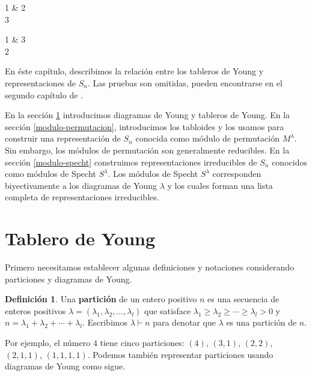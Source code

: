 \documentclass[12pt]{book}
\theoremstyle{definition}
\newtheorem{definition}[theorem]{Definición}
\newcounter{in}
\newcounter{ini}
\begin{document}
\begin{center}
  \begin{ytableau}
    1 & 2\\
    3
  \end{ytableau} \qquad
  \begin{ytableau}
    1 & 3\\
    2
  \end{ytableau}
\end{center}

En éste capítulo, describimos la relación entre los tableros de Young
y representaciones de $S_{n}$. Las pruebas son omitidas, pueden
encontrarse en el segundo capítulo de \cite{sagan2001symmetric}.

En la sección \ref{tablero} introducimos diagramas de Young y tableros
de Young. En la sección \ref{modulo-permutacion}, introducimos los
tabloides y los usamos para construir una representación de $S_{n}$
conocida como módulo de permutación $M^{\lambda}$. Sin embargo, los
módulos de permutación son generalmente reducibles. En la sección
\ref{modulo-specht} construimos representaciones irreducibles de
$S_{n}$ conocidos como módulos de Specht $S^{\lambda}$. Los módulos de
Specht $S^{\lambda}$ corresponden biyectivamente a los diagramas de
Young $\lambda$ y los cuales forman una lista completa de
representaciones irreducibles. 

\section{Tablero de Young}
\label{tablero}

Primero necesitamos establecer algunas definiciones y notaciones
considerando particiones y diagramas de Young.

\begin{definition}
  Una \textbf{partición} de un entero positivo $n$ es una secuencia de
  enteros positivos
  $\lambda=(\lambda_{1},\lambda_{2},\ldots,\lambda_{l})$ que satisface
  $\lambda_{1}\geq\lambda_{2}\geq\cdots\geq\lambda_{l}>0$ y
  $n=\lambda_{1}+\lambda_{2}+\cdots+\lambda_{l}$. Escribimos
  $\lambda\vdash n$ para denotar que $\lambda$ es una partición de $n$.
\end{definition}

Por ejemplo, el número $4$ tiene cinco particiones: $(4)$, $(3,1)$,
$(2,2)$, $(2,1,1)$, $(1,1,1,1)$. Podemos también representar
particiones usando diagramas de Young como sigue.
\end{document}
